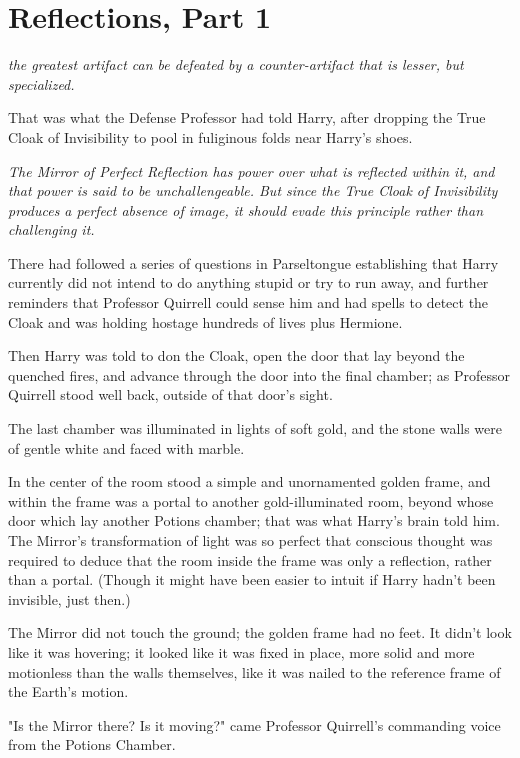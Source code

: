 \chapter{Reflections, Part 1}

 \emph{the
greatest artifact can be defeated by a counter-artifact that is lesser, but
specialized.}

That was what the Defense Professor had told Harry, after dropping the True
Cloak of Invisibility to pool in fuliginous folds near Harry's shoes.

\emph{The Mirror of Perfect Reflection has power over what is reflected within
it, and that power is said to be unchallengeable. But since the True Cloak of
Invisibility produces a perfect absence of image, it should evade this
principle rather than challenging it.}

There had followed a series of questions in Parseltongue establishing that
Harry currently did not intend to do anything stupid or try to run away, and
further reminders that Professor Quirrell could sense him and had spells to
detect the Cloak and was holding hostage hundreds of lives plus Hermione.

Then Harry was told to don the Cloak, open the door that lay beyond the
quenched fires, and advance through the door into the final chamber; as
Professor Quirrell stood well back, outside of that door's sight.

The last chamber was illuminated in lights of soft gold, and the stone walls
were of gentle white and faced with marble.

In the center of the room stood a simple and unornamented golden frame, and
within the frame was a portal to another gold-illuminated room, beyond whose
door which lay another Potions chamber; that was what Harry's brain told him.
The Mirror's transformation of light was so perfect that conscious thought was
required to deduce that the room inside the frame was only a reflection, rather
than a portal. (Though it might have been easier to intuit if Harry hadn't been
invisible, just then.)

The Mirror did not touch the ground; the golden frame had no feet. It didn't
look like it was hovering; it looked like it was fixed in place, more solid and
more motionless than the walls themselves, like it was nailed to the reference
frame of the Earth's motion.

"Is the Mirror there? Is it moving?" came Professor Quirrell's commanding voice
from the Potions Chamber.


